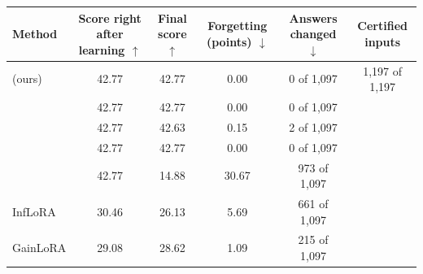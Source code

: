 \begin{tabular}{lccccc}
    \toprule
    Method & \shortstack[c]{Score\\right after\\learning $\uparrow$} & \shortstack[c]{Final\\score $\uparrow$} & \shortstack[c]{Forgetting\\(points) $\downarrow$} & \shortstack[c]{Answers\\changed $\downarrow$} & Certified inputs \\
    \midrule
    \cert{} (ours) & 42.77 & 42.77 & 0.00 & 0 of 1{,}097 & 1{,}197 of 1{,}197 \\
    \nearest{} & 42.77 & 42.77 & 0.00 & 0 of 1{,}097 &  \\
    \centre{} & 42.77 & 42.63 & 0.15 & 2 of 1{,}097 &  \\
    \keyswitch{} & 42.77 & 42.77 & 0.00 & 0 of 1{,}097 &  \\
    \plain{} & 42.77 & 14.88 & 30.67 & 973 of 1{,}097 &  \\
    \midrule
    InfLoRA & 30.46 & 26.13 & 5.69 & 661 of 1{,}097 &  \\
    GainLoRA & 29.08 & 28.62 & 1.09 & 215 of 1{,}097 &  \\
    \bottomrule
\end{tabular}

